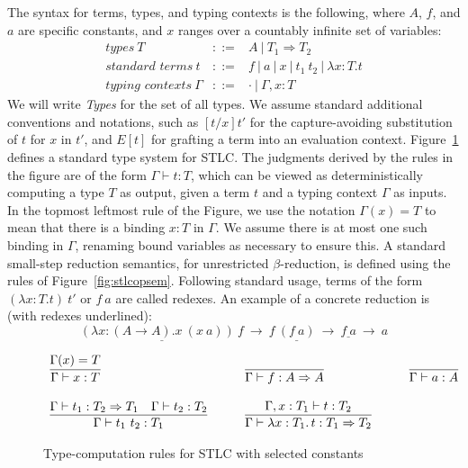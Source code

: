 \documentclass{LMCS}
\newcommand{\To}[0]{\Rightarrow}
\begin{document}
The syntax for terms, types, and typing contexts is the following,
where $A$, $f$, and $a$ are specific constants, and $x$ ranges over a
countably infinite set of variables:
\[
\begin{array}{lll}
\textit{types}\ T & ::= & A\ |\ T_1 \To T_2 \\
\textit{standard terms}\ t & ::= & f\ |\ a\ |\ x\ |\ t_1\ t_2\ |\ \lambda x:T.t \\
\textit{typing contexts}\ \Gamma & ::= & \cdot\ |\ \Gamma, x:T
\end{array}
\]
\noindent We will write \textit{Types} for the set of all types.  We
assume standard additional conventions and notations, such as
$[t/x]t'$ for the capture-avoiding substitution of $t$ for $x$ in
$t'$, and $E[t]$ for grafting a term into an evaluation context.
Figure~\ref{fig:stlc} defines a standard type system for STLC.  The
judgments derived by the rules in the figure are of the form
$\Gamma\vdash t:T$, which can be viewed as deterministically computing
a type $T$ as output, given a term $t$ and a typing context $\Gamma$
as inputs.  In the topmost leftmost rule of the Figure, we use the
notation $\Gamma(x) = T$ to mean that there is a binding $x:T$ in
$\Gamma$.  We assume there is at most one such binding in $\Gamma$,
renaming bound variables as necessary to ensure this.  A standard
small-step reduction semantics, for unrestricted $\beta$-reduction, is
defined using the rules of Figure~\ref{fig:stlcopsem}.  Following
standard usage, terms of the form $(\lambda x:T. t)\ t'$ or $f\ a$ are
called redexes.  An example of a concrete reduction is (with redexes
underlined):
\[
\underline{(\lambda x:(A\to A).x\ (x\ a))\ f}\ \to\ f\ \underline{(f\ a)}\ \to\ \underline{f\ a}\ \to\ a
\]


\begin{figure}
\[
\begin{array}{lllll}
\infer{\Gamma\vdash x : T}{\Gamma(x) = T}

&\ \ \ &

\infer{\Gamma\vdash f : A\To A}{\ }

&\ \ \ &

\infer{\Gamma\vdash a : A}{\ }

\\ \\

\infer{\Gamma\vdash t_1\ t_2 : T_1}
      {\Gamma\vdash t_1 : T_2 \To T_1 &
       \Gamma\vdash t_2 : T_2}

&\ \ \ &

\infer{\Gamma\vdash \lambda x : T_1.\,t : T_1 \To T_2}
      {\Gamma,x:T_1\vdash t:T_2}

&\ \ \ & \

\end{array}
\]
\caption{Type-computation rules for STLC with selected constants}
\label{fig:stlc}
\end{figure}
\end{document}
